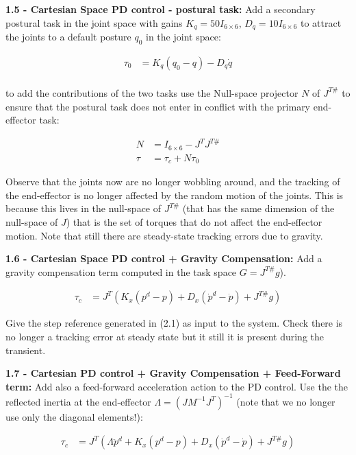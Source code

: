 \documentclass[11pt]{article}
\begin{document}
\quad

\noindent
\textbf{1.5 - Cartesian Space PD control - postural task:}
Add  a secondary postural task in the joint space with  gains $K_q= 50 I_{6 \times6}$,   $D_q = 10I_{6 \times6}$ to attract the joints to a default posture $q_0$ in the joint space:

\begin{align}
\tau_0& = K_q(q_0-q) - D_q\dot{q}\\
\end{align}

to add the contributions of the two  tasks use the Null-space projector $N$ of $J^{T\#}$ to ensure that the postural task does not enter in conflict with the primary end-effector task:

\begin{align}
N & = I_{6 \times 6} - J^T J^{T\#}\\
\tau& = \tau_c  + N\tau_0 
\end{align}

Observe that the joints now are no longer wobbling around, and the tracking of the end-effector is no longer affected by the random motion of the joints. 
This is because this lives in the null-space of $J^{T\#}$ (that has the same dimension of the null-space of $J$) that is the set of torques that do not affect the end-effector motion. Note that still there are steady-state tracking errors due to gravity.

\quad

\noindent
\textbf{1.6 - Cartesian Space PD control + Gravity Compensation:}
Add a gravity compensation term computed in the task space $G= J^{T\#}g$).

\begin{align}
\tau_c & = J^T\left( K_x(p^d - p) + D_x(\dot{p}^d -\dot{p})  + J^{T\#}g \right)
\end{align}

Give the step reference generated in (2.1) as input to the system. 
Check there is no longer a  tracking error at steady state but  it still it is present during the transient. 

\quad

\noindent
\textbf{1.7 - Cartesian PD control  + Gravity Compensation + Feed-Forward term:}
Add also a feed-forward acceleration action to the PD control. Use the the reflected inertia
at the end-effector $\Lambda = (J M^{-1} J^T)^{-1}$ (note that we no longer use only the diagonal elements!):

\begin{align}
\tau_c & = J^T\left( \Lambda \ddot{p}^d + K_x(p^d - p) + D_x(\dot{p}^d -\dot{p})  + J^{T\#}g \right)
\end{align}
\end{document}
